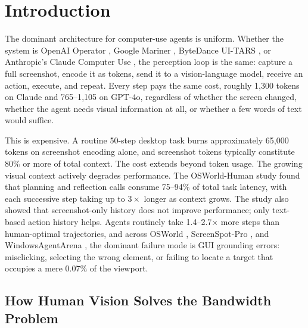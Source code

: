 \documentclass[11pt,a4paper]{article}
\begin{document}

\section{Introduction}
\label{sec:introduction}

The dominant architecture for computer-use agents is uniform.
Whether the system is OpenAI Operator \cite{openai-operator}, Google Mariner \cite{google-mariner}, ByteDance UI-TARS \cite{ui-tars,ui-tars-2}, or Anthropic's Claude Computer Use \cite{claude-computer-use}, the perception loop is the same: capture a full screenshot, encode it as tokens, send it to a vision-language model, receive an action, execute, and repeat.
Every step pays the same cost, roughly 1{,}300 tokens on Claude and 765--1{,}105 on GPT-4o, regardless of whether the screen changed, whether the agent needs visual information at all, or whether a few words of text would suffice.

This is expensive.
A routine 50-step desktop task burns approximately 65{,}000 tokens on screenshot encoding alone, and screenshot tokens typically constitute 80\% or more of total context.
The cost extends beyond token usage.
The growing visual context actively degrades performance.
The OSWorld-Human study \cite{osworld-human} found that planning and reflection calls consume 75--94\% of total task latency, with each successive step taking up to $3\times$ longer as context grows.
The study also showed that screenshot-only history does not improve performance; only text-based action history helps.
Agents routinely take 1.4--2.7$\times$ more steps than human-optimal trajectories, and across OSWorld \cite{osworld}, ScreenSpot-Pro \cite{screenspot-pro}, and WindowsAgentArena \cite{windowsagentarena}, the dominant failure mode is GUI grounding errors: misclicking, selecting the wrong element, or failing to locate a target that occupies a mere 0.07\% of the viewport.

\subsection{How Human Vision Solves the Bandwidth Problem}
\label{sec:intro-human-vision}
\end{document}
